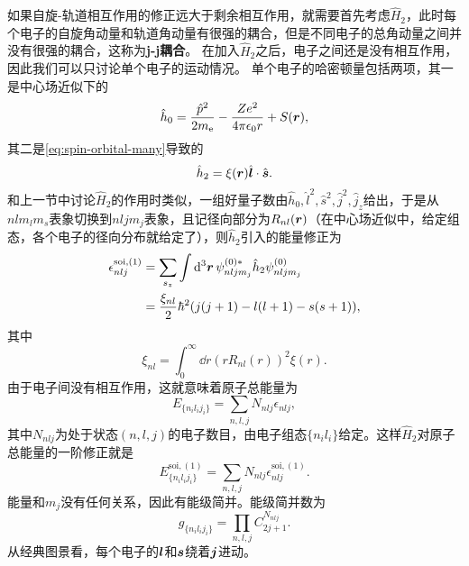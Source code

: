 \documentclass[UTF8, a4paper]{ctexart}
\begin{document}
如果自旋-轨道相互作用的修正远大于剩余相互作用，就需要首先考虑$\hat{H}_2$，此时每个电子的自旋角动量和轨道角动量有很强的耦合，但是不同电子的总角动量之间并没有很强的耦合，这称为\textbf{j-j耦合}。
在加入$\hat{H}_2$之后，电子之间还是没有相互作用，因此我们可以只讨论单个电子的运动情况。
单个电子的哈密顿量包括两项，其一是中心场近似下的
\[
    \hat{h}_0 = \frac{\hat{p}^2}{2m_\text{e}} - \frac{Z e^2}{4\pi \epsilon_0 r} + S(\vb*{r}),
\]
其二是\eqref{eq:spin-orbital-many}导致的
\[
    \hat{h}_2 = \xi(\vb*{r}) \hat{\vb*{l}} \cdot \hat{\vb*{s}}.
\]
和上一节中讨论$\hat{H}_2$的作用时类似，一组好量子数由$\hat{h}_0, \hat{l}^2, \hat{s}^2, \hat{j}^2, \hat{j}_z$给出，于是从$nl m_l m_s$表象切换到$nlj m_j$表象，且记径向部分为$R_{nl}(\vb*{r})$（在中心场近似中，给定组态，各个电子的径向分布就给定了），则$\hat{h}_2$引入的能量修正为
\begin{equation}
    \begin{aligned}
        \epsilon_{nlj}^{\text{soi}, (1)} &= \sum_{s_z} \int \dd[3]{\vb*{r}} \psi^{(0)*}_{nlj m_j} \hat{h}_2 \psi^{(0)}_{nlj m_j} \\
        &= \frac{\xi_{nl}}{2} \hbar^2 (j(j+1) - l(l+1) - s(s+1)),
    \end{aligned}
\end{equation}
其中
\begin{equation}
    \xi_{nl} = \int_0^\infty \dd{r} (r R_{nl}(r))^2 \xi(r).
\end{equation}
由于电子间没有相互作用，这就意味着原子总能量为
\[
    E_{\{n_i l_i j_i\}} = \sum_{n, l, j} N_{nlj} \epsilon_{nlj},
\]
其中$N_{nlj}$为处于状态$(n, l, j)$的电子数目，由电子组态$\{n_i l_i\}$给定。这样$\hat{H}_2$对原子总能量的一阶修正就是
\begin{equation}
    E^{\text{soi}, (1)}_{\{n_i l_i j_i\}} = \sum_{n, l, j} N_{nlj} \epsilon_{nlj}^{\text{soi}, (1)}.
\end{equation}
能量和$m_j$没有任何关系，因此有能级简并。能级简并数为
\begin{equation}
    g_{\{n_i l_i j_i\}} = \prod_{n, l, j} C_{2j+1}^{N_{nlj}}.
\end{equation}
从经典图景看，每个电子的$\vb*{l}$和$\vb*{s}$绕着$\vb*{j}$进动。
\end{document}
